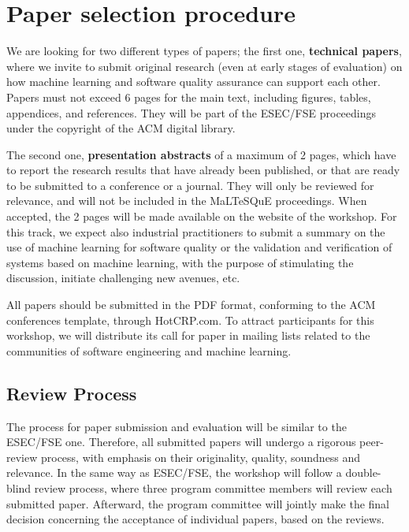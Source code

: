 
\section{Paper selection procedure}
\label{sec:submissions}

We are looking for two different types of papers; the first one, \ie \textbf{technical papers}, where we invite to submit original research (even at early stages of evaluation) on how machine learning and software quality assurance can support each other.
Papers must not exceed 6 pages for the main text, including figures, tables, appendices, and references.
They will be part of the ESEC/FSE proceedings under the copyright of the ACM digital library.

The second one, \ie \textbf{presentation abstracts} of a maximum of 2 pages, which have to report the research results that have already been published, or that are ready to be submitted to a conference or a journal.
They will only be reviewed for relevance, and will not be included in the MaLTeSQuE proceedings.
When accepted, the 2 pages will be made available on the website of the workshop.
For this track, we expect also industrial practitioners to submit a summary on the use of machine learning for software quality or the validation and verification of systems based on machine learning, with the purpose of stimulating the discussion, initiate challenging new avenues, etc.

All papers should be submitted in the PDF format, conforming to the ACM conferences template, through HotCRP.com.
To attract participants for this workshop, we will distribute its call for paper in mailing lists related to the communities of software engineering and machine learning.

\subsection{Review Process}

The process for paper submission and evaluation will be similar to the ESEC/FSE one.
Therefore, all submitted papers will undergo a rigorous peer-review process, with emphasis on their originality, quality, soundness and relevance.
In the same way as ESEC/FSE, the workshop will follow a double-blind review process, where three program committee members will review each submitted paper.
Afterward, the program committee will jointly make the final decision concerning the acceptance of individual papers, based on the reviews.

